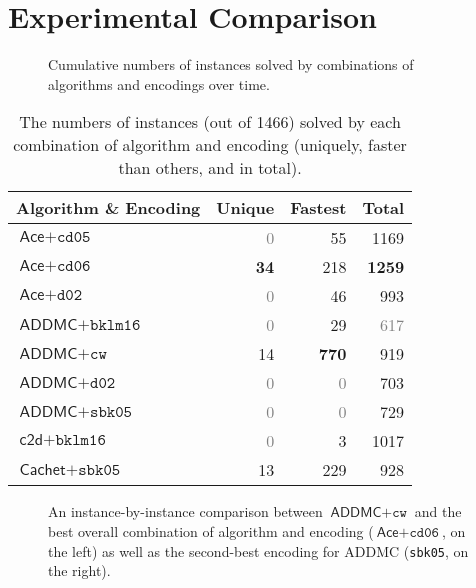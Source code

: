 \documentclass{uai2021} %
\theoremstyle{definition}
\begin{document}
\section{Experimental Comparison} \label{sec:experiments}

\begin{figure*}[t]
  \centering
  \caption{Cumulative numbers of instances solved by combinations of algorithms
    and encodings over time.}
  \label{fig:cumulative}
\end{figure*}

\begin{table}
  \centering
  \caption{The numbers of instances (out of 1466) solved by
    each combination of algorithm and encoding (uniquely, faster than others, and in total).}%
  \begin{tabular}{lrrr}
    \toprule
    Algorithm \& Encoding & Unique & Fastest & Total \\
    \midrule
    $\textsf{Ace} + \texttt{cd05}$ & \textcolor{gray}{0} & 55 & 1169 \\
    $\textsf{Ace} + \texttt{cd06}$ & \textbf{34} & 218 & \textbf{1259} \\
    $\textsf{Ace} + \texttt{d02}$ & \textcolor{gray}{0} & 46 & 993 \\
    $\textsf{ADDMC} + \texttt{bklm16}$ & \textcolor{gray}{0} & 29 & \textcolor{gray}{617} \\
    $\textsf{ADDMC} + \texttt{cw}$ & 14 & \textbf{770} & 919 \\
    $\textsf{ADDMC} + \texttt{d02}$ & \textcolor{gray}{0} & \textcolor{gray}{0} & 703 \\
    $\textsf{ADDMC} + \texttt{sbk05}$ & \textcolor{gray}{0} & \textcolor{gray}{0} & 729 \\
    $\textsf{c2d} + \texttt{bklm16}$ & \textcolor{gray}{0} & 3 & 1017 \\
    $\textsf{Cachet} + \texttt{sbk05}$ & 13 & 229 & 928 \\
    \bottomrule
  \end{tabular}
  \label{tbl:tallies}
\end{table}

\begin{figure*}[t]
  \centering
  \caption{An instance-by-instance comparison between $\textsf{ADDMC} +
    \texttt{cw}$ and the best overall combination of algorithm and encoding
    ($\textsf{Ace} + \texttt{cd06}$, on the left) as well as the second-best
    encoding for \textsf{ADDMC} (\texttt{sbk05}, on the right).}
  \label{fig:scatter}
\end{figure*}
\end{document}
